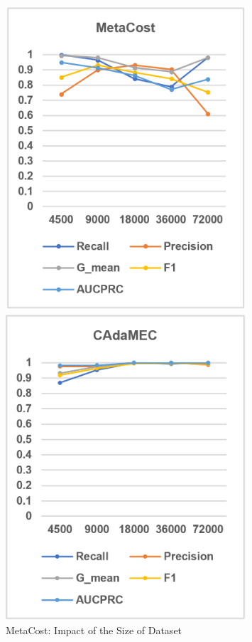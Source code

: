 \begin{figure}[h]
    \centering 
    \begin{minipage}{0.31\textwidth}
        \centering
        \includegraphics[width=0.8\textwidth]{images/fig21}
        \caption{MetaCost: Impact of the Size of Dataset}
        \label{fig21}
    \end{minipage}
    \hspace{5pt}
    \begin{minipage}{0.31\textwidth}
        \centering
        \includegraphics[width=0.8\textwidth]{images/fig22}

\end{minipage}
\end{figure}
